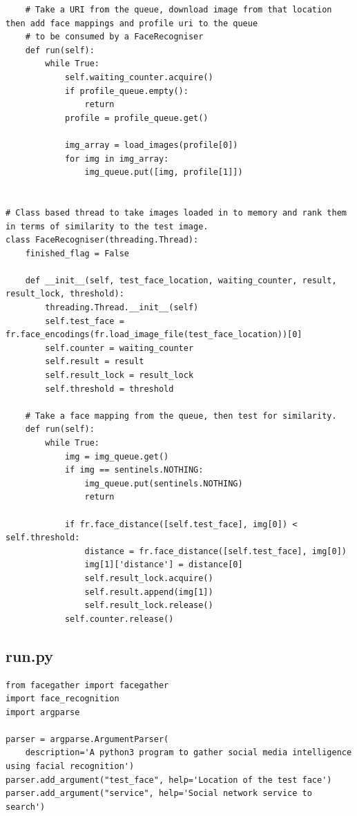 \documentclass[12pt]{article}
\begin{document}
\begin{appendices}
\begin{lstlisting}
    # Take a URI from the queue, download image from that location then add face mappings and profile uri to the queue
    # to be consumed by a FaceRecogniser
    def run(self):
        while True:
            self.waiting_counter.acquire()
            if profile_queue.empty():
                return
            profile = profile_queue.get()

            img_array = load_images(profile[0])
            for img in img_array:
                img_queue.put([img, profile[1]])


# Class based thread to take images loaded in to memory and rank them in terms of similarity to the test image.
class FaceRecogniser(threading.Thread):
    finished_flag = False

    def __init__(self, test_face_location, waiting_counter, result, result_lock, threshold):
        threading.Thread.__init__(self)
        self.test_face = fr.face_encodings(fr.load_image_file(test_face_location))[0]
        self.counter = waiting_counter
        self.result = result
        self.result_lock = result_lock
        self.threshold = threshold

    # Take a face mapping from the queue, then test for similarity.
    def run(self):
        while True:
            img = img_queue.get()
            if img == sentinels.NOTHING:
                img_queue.put(sentinels.NOTHING)
                return

            if fr.face_distance([self.test_face], img[0]) < self.threshold:
                distance = fr.face_distance([self.test_face], img[0])
                img[1]['distance'] = distance[0]
                self.result_lock.acquire()
                self.result.append(img[1])
                self.result_lock.release()
            self.counter.release()

\end{lstlisting}

\subsection{run.py}
\begin{lstlisting}
from facegather import facegather
import face_recognition
import argparse

parser = argparse.ArgumentParser(
    description='A python3 program to gather social media intelligence using facial recognition')
parser.add_argument("test_face", help='Location of the test face')
parser.add_argument("service", help='Social network service to search')


\end{lstlisting}
\end{appendices}
\end{document}
